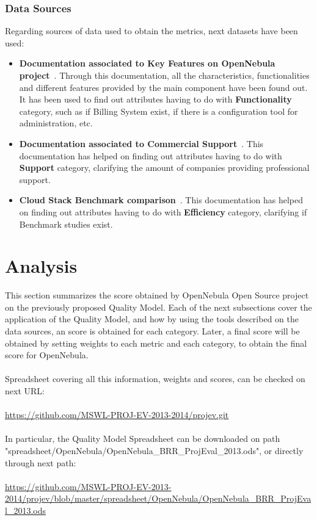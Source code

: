 \documentclass[11pt]{article}
\begin{document}
\subsubsection{Data Sources}
Regarding sources of data used to obtain the metrics, next datasets have been used:
\begin{itemize}\itemsep0pt
\item{\textbf{Documentation associated to Key Features on OpenNebula project}~\cite{OPNEB00}}. Through this documentation, all the characteristics, functionalities and different features provided by the main component have been found out. It has been used to find out attributes having to do with \textbf{Functionality} category, such as if Billing System exist, if there is a configuration tool for administration, etc.
\item{\textbf{Documentation associated to Commercial Support}~\cite{OPNEB01}}. This documentation has helped on finding out attributes having to do with \textbf{Support} category, clarifying the amount of companies providing professional support.
\item{\textbf{Cloud Stack Benchmark comparison}~\cite{BENCH00}}. This documentation has helped on finding out attributes having to do with \textbf{Efficiency} category, clarifying if Benchmark studies exist.
\end{itemize}

\section{Analysis}\label{sec:analysis}

This section summarizes the score obtained by OpenNebula Open Source project on the previously proposed Quality Model. Each of the next subsections cover the application of the Quality Model, and how by using the tools described on the data sources, an score is obtained for each category. Later, a final score will be obtained by setting weights to each metric and each category, to obtain the final score for OpenNebula.\\
\\
Spreadsheet covering all this information, weights and scores, can be checked on next URL:\\
\\
\url{https://github.com/MSWL-PROJ-EV-2013-2014/projev.git}\\
\\
In particular, the Quality Model Spreadsheet can be downloaded on path "spreadsheet/OpenNebula/OpenNebula\_BRR\_ProjEval\_2013.ods", or directly through next path:\\
\\
\url{https://github.com/MSWL-PROJ-EV-2013-2014/projev/blob/master/spreadsheet/OpenNebula/OpenNebula\_BRR\_ProjEval\_2013.ods}
\end{document}
